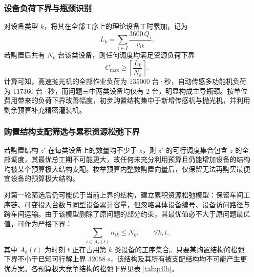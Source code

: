 \documentclass[12pt,a4paper]{article}
\begin{document}
\subsubsection{设备负荷下界与瓶颈识别}

对设备类型 $k$，将其在全部工序上的理论设备工时累加，记为
\begin{equation}
L_k=\sum_{i\in I}\frac{3600\,Q_i}{v_{ik}} .
\label{eq:p4loaddef}
\end{equation}
若购置后共有 $N_k$ 台该类设备，则任何调度均满足资源负荷下界
\begin{equation}
C_{\max}\ge \left\lceil\frac{L_k}{N_k}\right\rceil .
\label{eq:p4load}
\end{equation}
计算可知，高速抛光机的全部作业负荷为 $135000$ 台·秒，自动传感多功能机负荷为 $117360$ 台·秒，而问题三中两类设备均仅有 2 台，明显构成主导瓶颈。按单位费用带来的负荷下界改善幅度，初步购置结构集中于新增传感机与抛光机，并利用剩余预算补充精密灌装机。

\subsubsection{购置结构支配筛选与累积资源松弛下界}

若购置结构 $z'$ 在每类设备上的数量均不少于 $z$，则 $z'$ 的可行调度集合包含 $z$ 的全部调度，其最优总工期不可能更大，故任何未充分利用预算且仍能增加设备的结构均被某个预算极大结构支配。枚举预算内整数购置向量后，仅保留无法再购买最便宜设备的预算极大结构。

对第一轮筛选后仍可能优于当前上界的结构，建立累积资源松弛模型：保留车间工序链、可变投入台数与同型设备累计容量，但忽略具体设备编号、设备访问路径与跨车间运输。由于该模型删除了原问题的部分约束，其最优值必不大于原问题最优值，可作为严格下界：
\begin{equation}
\sum_{i\in A_k(t)} n_{ik}\le N_k,\qquad \forall k,t .
\label{eq:p4relax}
\end{equation}
其中 $A_k(t)$ 为时刻 $t$ 正在占用第 $k$ 类设备的工序集合。只要某购置结构的松弛下界不小于已知可行解上界 $32058$ s，该结构及其所有被支配结构均不可能产生更优方案。各预算极大竞争结构的松弛下界见表 \ref{tab:p4lb}。
\end{document}
